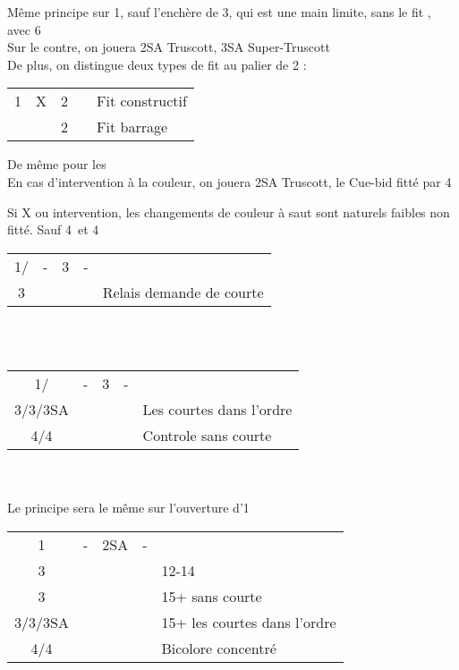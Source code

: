 \documentclass[a4paper, oneside, 11pt]{report}
\begin{document}
	Même principe sur 1\pique, sauf l'enchère de 3\coeur, qui est une main limite, sans le fit \pique, avec 6\coeur\\

		Sur le contre, on jouera 2SA Truscott, 3SA Super-Truscott\\
		De plus, on distingue deux types de fit au palier de 2 :

		\begin{tabular}{cccc|l}
		1\coeur & X & 2\carreau && Fit constructif\\
		&& 2\coeur && Fit barrage\\
		\end{tabular}
		
		De même pour les \pique\\

		En cas d'intervention à la couleur, on jouera 2SA Truscott, le Cue-bid fitté par 4
		
		Si X ou intervention, les changements de couleur à saut sont naturels faibles non fitté. Sauf 4\trefle\ et 4\carreau\\

		\begin{tabular}{cccc|l}
		1\coeur/\pique & - & 3\trefle & - &\\
		3\carreau &&&& Relais demande de courte\\
		\end{tabular}\\\\
		
		\begin{tabular}{cccc|l}
		1\coeur/\pique & - & 3\trefle & - &\\
		3\coeur/3\pique/3SA &&&& Les courtes dans l'ordre\\
		4\trefle/4\carreau &&&& Controle sans courte\\
		\end{tabular}\\\\

		Le principe sera le même sur l'ouverture d'1\pique\\
		
		\begin{tabular}{cccc|l}
		1\coeur & - & 2SA & - &\\
		3\trefle &&&& 12-14\\
		3\carreau &&&& 15+ sans courte\\
		3\coeur/3\pique/3SA &&&& 15+ les courtes dans l'ordre\\
		4\trefle/4\carreau &&&& Bicolore concentré\\
		\end{tabular}\\\\
		
\end{document}
